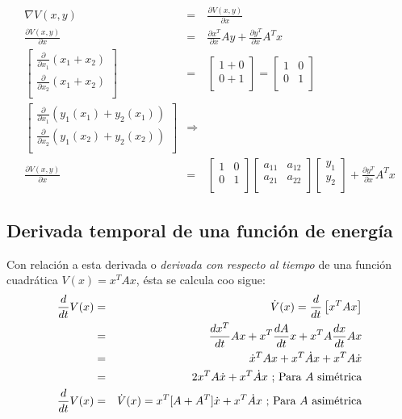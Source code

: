 \documentclass[12pt,spanish,lettersize]{report}
\begin{document}
\begin{eqnarray}
\nonumber\nabla V(x,y)&=&\frac{\partial V(x,y)}{\partial x}\\
\nonumber\frac{\partial V(x,y)}{\partial x}&=&\frac{\partial x^T}{\partial x}Ay+\frac{\partial y^T}{\partial x}A^Tx\\
\nonumber\left[\begin{array}{c}
\frac{\partial}{\partial x_1}(x_1+x_2)\\
\frac{\partial}{\partial x_2}(x_1+x_2)\\
\end{array}\right]&=&\left[\begin{array}{c}
1+0\\
0+1\\
\end{array}\right]=\left[\begin{array}{cc}
1&0\\
0&1\\
\end{array}\right]\\
\nonumber\left[\begin{array}{c}
\frac{\partial}{\partial x_1}(y_1(x_1)+y_2(x_1))\\
\frac{\partial}{\partial x_2}(y_1(x_2)+y_2(x_2))\\
\end{array}\right]&\Rightarrow&\\
\nonumber\frac{\partial V(x,y)}{\partial x}&=&\left[\begin{array}{cc}
1&0\\
0&1\\
\end{array}\right]\left[\begin{array}{cc}
a_{11}&a_{12}\\
a_{21}&a_{22}\\
\end{array}\right]\left[\begin{array}{c}
y_1\\
y_2\\
\end{array}\right]+\frac{\partial y^T}{\partial x}A^Tx
\end{eqnarray}
\subsection{Derivada temporal de una funci\'on de energ\'ia}
Con relaci\'on a esta derivada o \emph{derivada con respecto al tiempo} de una funci\'on cuadr\'atica $V(x)=x^TAx$, \'esta se calcula coo sigue:
\begin{eqnarray}
\nonumber\frac{d}{dt}V(x)&=&\dot{V}(x)=\frac{d}{dt}\left[x^TAx\right]\\
\nonumber&=&\frac{dx^T}{dt}Ax+x^T\frac{dA}{dt}x+x^TA\frac{dx}{dt}Ax\\
\nonumber&=&\dot{x}^TAx+x^T\dot{A}x+x^TA\dot{x}\\
&=&2x^TA\dot{x}+x^T\dot{A}x\ \textnormal{; Para $A$ sim\'etrica}\\
\frac{d}{dt}V(x)&=&\dot{V}(x)=x^T[A+A^T]\dot{x}+x^T\dot{A}x\ \textnormal{; Para $A$ asim\'etrica}
\end{eqnarray}
\end{document}
